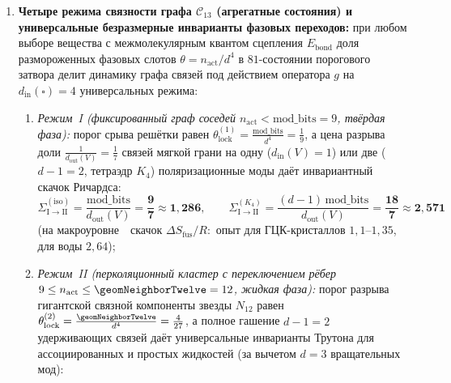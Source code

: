 \begin{theorem}[Классификация четырёх элементарных механизмов химических реакций по каналам $(V,E,\triangle,\square)$ и закон $8 = 3 + 2 + 3$ ферментативного катализа]
\begin{enumerate}[leftmargin=*]
\begin{equation}
\begin{aligned}
    E_a^{(1\text{ замок})} &= (\vevHierarchySteps - d)E_{\mathrm{soft}}^{(m)} = \mathbf{5\,E_{\mathrm{soft}}^{(m)}}
    \approx \bigl\{29{,}8,\ \mathbf{104{,}2},\ 208{,}4\bigr\}\ \text{кДж}\cdot\text{моль}^{-1}\quad (\text{одна триада}),\\
    E_a^{(2\text{ замка})} &= d\,E_{\mathrm{soft}}^{(m)} = \mathbf{3\,E_{\mathrm{soft}}^{(m)}}
    \approx \bigl\{17{,}9,\ \mathbf{62{,}5},\ 125{,}0\bigr\}\ \text{кДж}\cdot\text{моль}^{-1}\quad (\text{протеазы и рибосома}),\\
    E_a^{(3\text{ замка})} &= s_0 E_{\mathrm{soft}}^{(m)} = \mathbf{\frac{1}{2}\,E_{\mathrm{soft}}^{(m)}}
    \approx \bigl\{2{,}98,\ \mathbf{10{,}42},\ 20{,}84\bigr\}\ \text{кДж}\cdot\text{моль}^{-1}\quad (\text{металлоферменты}).
  \end{aligned}
  \end{equation}
\item \textbf{Четыре режима связности графа $\mathcal{C}_{13}$ (агрегатные состояния) и универсальные безразмерные инварианты фазовых переходов:}
  при любом выборе вещества с межмолекулярным квантом сцепления $E_{\mathrm{bond}}$ доля размороженных фазовых слотов $\theta = n_{\mathrm{act}} / d^4$ в $81$-состоянии порогового затвора делит динамику графа связей под действием оператора $g$ на $d_{\mathrm{in}}(\square) = 4$ универсальных режима:
  \begin{enumerate}[label=(\roman*),leftmargin=*,noitemsep]
  \item \emph{Режим~I (фиксированный граф соседей $n_{\mathrm{act}} < \mathrm{mod\_bits} = 9$, твёрдая фаза):} порог срыва решётки равен $\theta_{\mathrm{lock}}^{(1)} = \frac{\mathrm{mod\_bits}}{d^4} = \frac{1}{9}$, а цена разрыва доли $\frac{1}{d_{\mathrm{out}}(V)} = \frac{1}{7}$ связей мягкой грани на одну ($d_{\mathrm{in}}(V)=1$) или две ($d-1=2$, тетраэдр $K_4$) поляризационные моды даёт инвариантный скачок Ричардса:
    \begin{equation}
    \label{eq:bio-richards-fusion-invariants}
      \Sigma_{\mathrm{I\to II}}^{(\mathrm{iso})} = \frac{\mathrm{mod\_bits}}{d_{\mathrm{out}}(V)} = \mathbf{\frac{9}{7} \approx 1{,}286},\qquad
      \Sigma_{\mathrm{I\to II}}^{(K_4)} = \frac{(d-1)\,\mathrm{mod\_bits}}{d_{\mathrm{out}}(V)} = \mathbf{\frac{18}{7} \approx 2{,}571}
    \end{equation}
    (на макроуровне~\Tlayer\ скачок $\Delta S_{\mathrm{fus}}/R\colon$ опыт для ГЦК-кристаллов $1{,}1\text{--}1{,}35$, для воды $2{,}64$);
  \item \emph{Режим~II (перколяционный кластер с переключением рёбер $9 \le n_{\mathrm{act}} \le \geomNeighborTwelve = 12$, жидкая фаза):} порог разрыва гигантской связной компоненты звезды $N_{12}$ равен $\theta_{\mathrm{lock}}^{(2)} = \frac{\geomNeighborTwelve}{d^4} = \frac{4}{27}$, а полное гашение $d-1 = 2$ удерживающих связей даёт универсальные инварианты Трутона для ассоциированных и простых жидкостей (за вычетом $d=3$ вращательных мод):

\end{enumerate}
\end{enumerate}
\end{theorem}
